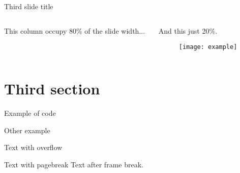 \begin{frame}{Third slide title}
	\begin{columns}
		\begin{column}{0.8\textwidth} %
			This column occupy 80\% of the slide width...
			\pause
		\end{column}
		\begin{column}{0.2\textwidth}
			And this just 20\%.\\
			\begin{figure}
				\centering
				\texttt{[image: example]}
			\end{figure}
		\end{column}
	\end{columns}
\end{frame}

\section{Third section}

\begin{frame}{Example of code}
\end{frame}

\begin{frame}{Other example}
	\centering %
\end{frame}

\begin{frame}[shrink=20]{Text with overflow} %
  \lipsum[1-2]
\end{frame}

\begin{frame}[allowframebreaks]{Text with pagebreak} %
  \lipsum[1-2]
  \framebreak %
  Text after frame break.
\end{frame}
